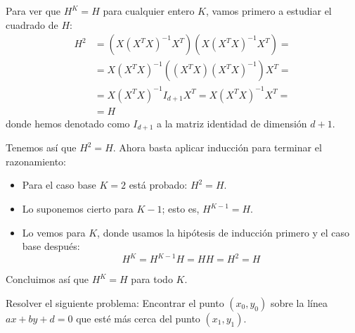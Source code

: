 \documentclass[a4paper, 11pt]{article}
\begin{document}
      Para ver que $H^K = H$ para cualquier entero $K$, vamos primero a estudiar el cuadrado de $H$:
      \begin{align*}
          H^2 &= \left( X(X^TX)^{-1}X^T \right) \left( X(X^TX)^{-1}X^T \right) = \\
          &= X(X^TX)^{-1} \left( (X^T X)(X^TX)^{-1}  \right)X^T = \\
          &= X(X^TX)^{-1}I_{d+1}X^T = X(X^TX)^{-1}X^T = \\
          &= H
      \end{align*}
      donde hemos denotado como $I_{d+1}$ a la matriz identidad de dimensión $d+1$.

      Tenemos así que $H^2 = H$. Ahora basta aplicar inducción para terminar el razonamiento:
      \begin{itemize}
          \item Para el caso base $K=2$ está probado: $H^2 = H$.
          \item Lo suponemos cierto para $K-1$; esto es, $H^{K-1} = H$.
          \item Lo vemos para $K$, donde usamos la hipótesis de inducción primero y el caso base después:
          \[
          H^K = H^{K-1}H = HH = H^2 = H
          \]
      \end{itemize}

      Concluimos así que $H^K = H$ para todo $K$.

      \begin{ejercicio}
        Resolver el siguiente problema: Encontrar el punto $(x_0,y_0)$ sobre la línea $ax+by+d=0$ que esté más cerca del punto $(x_1,y_1)$.
      \end{ejercicio}
\end{document}
